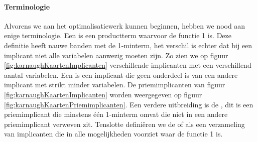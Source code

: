 \paragraph{Terminologie} Alvorens we aan het optimalisatiewerk kunnen beginnen, hebben we nood aan enige terminologie. Een  is een productterm waarvoor de functie 1 is. Deze definitie heeft nauwe banden met de 1-minterm, het verschil is echter dat bij een implicant niet alle variabelen aanwezig moeten zijn. Zo zien we op figuur \ref{fig:karnaughKaartenImplicanten} verschillende implicanten met een verschillend aantal variabelen. Een  is een implicant die geen onderdeel is van een andere implicant met strikt minder variabelen. De priemimplicanten van figuur \ref{fig:karnaughKaartenImplicanten} worden weergegeven op figuur \ref{fig:karnaughKaartenPriemimplicanten}. Een verdere uitbreiding is de , dit is een priemimplicant die minstens \'e\'en 1-minterm omvat die niet in een andere priemimplicant verweven zit. Tenslotte defini\"eren we de  of  als een verzameling van implicanten die in alle mogelijkheden voorziet waar de functie 1 is.
